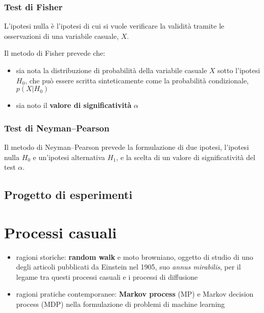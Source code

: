 \subsection{Test di Fisher}
\begin{definition} L'ipotesi nulla è l'ipotesi di cui si vuole verificare la validità tramite le osservazioni di una variabile casuale, $X$.
\end{definition}
Il metodo di Fisher prevede che:
\begin{itemize}
    \item sia nota la distribuzione di probabilità della variabile casuale $X$ sotto l'ipotesi $H_0$, che può essere scritta sinteticamente come la probabilità condizionale, $p(X|H_0)$
    \item sia noto il \textbf{valore di significatività} $\alpha$
\end{itemize}

\begin{example}
\end{example}

\subsection{Test di Neyman--Pearson}
Il metodo di Neyman--Pearson prevede la formulazione di due ipotesi, l'ipotesi nulla $H_0$ e un'ipotesi alternativa $H_1$, e la scelta di un valore di significatività del test $\alpha$.

\begin{example}
\end{example}

\section{Progetto di esperimenti}


\chapter{Processi casuali}
{\color{red}
\begin{itemize}
    \item ragioni storiche: \textbf{random walk} e moto browniano, oggetto di studio di uno degli articoli pubblicati da Einstein nel 1905, suo \textit{annus mirabilis}, per il legame tra questi processi casuali e i processi di diffusione
    \item ragioni pratiche contemporanee: \textbf{Markov process} (MP) e Markov decision process (MDP) nella formulazione di problemi di machine learning
\end{itemize}
}

